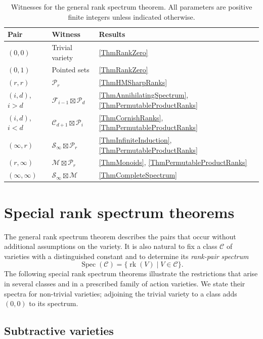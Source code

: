 \documentclass[12pt,english]{amsart}
\theoremstyle{definition}
\numberwithin{equation}{section}
\theoremstyle{remark}
\begin{document}
\begin{table}[H]
\centering
\small
\setlength{\tabcolsep}{5pt}
\caption{Witnesses for the general rank spectrum theorem. All parameters are
positive finite integers unless indicated otherwise.}
\label{TabCompleteSpectrum}
\begin{tabular}{@{}lll@{}}
\toprule
Pair & Witness & Results\\
\midrule
$(0,0)$ & Trivial variety & \ref{ThmRankZero}\\[3pt]
$(0,1)$ & Pointed sets & \ref{ThmRankZero}\\[3pt]
$(r,r)$ & $\mathcal P_r$ & \ref{ThmHMSharpRanks}\\[3pt]
$(i,d)$, $i>d$ & $\mathcal F_{i-1}\boxtimes\mathcal P_d$
 & \ref{ThmAnnihilatingSpectrum}, \ref{ThmPermutableProductRanks}\\[3pt]
$(i,d)$, $i<d$ & $\mathcal C_{d+1}\boxtimes\mathcal P_i$
 & \ref{ThmCornishRanks}, \ref{ThmPermutableProductRanks}\\[3pt]
$(\infty,r)$ & $\mathcal S_\infty\boxtimes\mathcal P_r$
 & \ref{ThmInfiniteInduction}, \ref{ThmPermutableProductRanks}\\[3pt]
$(r,\infty)$ & $\mathcal M\boxtimes\mathcal P_r$
 & \ref{ThmMonoids}, \ref{ThmPermutableProductRanks}\\[3pt]
$(\infty,\infty)$ & $\mathcal S_\infty\boxtimes\mathcal M$
 & \ref{ThmCompleteSpectrum}\\
\bottomrule
\end{tabular}
\end{table}

\section{Special rank spectrum theorems}\label{SecSpecialSpectra}

The general rank spectrum theorem describes the pairs that occur without
additional assumptions on the variety. It is also natural to fix a class
$\mathscr C$ of varieties with a distinguished constant and to determine
its \emph{rank-pair spectrum}
\[
\operatorname{Spec}(\mathscr C)
=\{\operatorname{rk}(V)\mid V\in\mathscr C\}.
\]
The following special rank spectrum theorems illustrate the restrictions
that arise in several classes and in a prescribed family of action
varieties. We state their spectra for non-trivial varieties; adjoining
the trivial variety to a class adds $(0,0)$ to its spectrum.

\subsection{Subtractive varieties}
\end{document}
